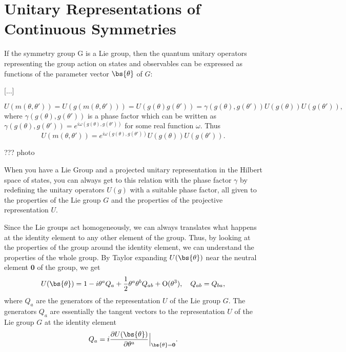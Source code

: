 \section{Unitary Representations of Continuous Symmetries}

If the symmetry group G is a Lie group, then the quantum unitary operators representing the group action on states and observables can be expressed as functions of the parameter vector \(\bs{\theta}\) of \(G\):

[...]

\[
    U(m(\theta, \theta')) = U(g(m(\theta, \theta'))) = U(g(\theta) g(\theta')) = \gamma(g(\theta), g(\theta')) U(g(\theta)) U(g(\theta')),
\]
where \(\gamma(g(\theta), g(\theta'))\) is a phase factor which can be written as \(\gamma(g(\theta), g(\theta')) = e^{i \omega(g(\theta), g(\theta'))}\) for some real function \(\omega\). Thus
\[
    U(m(\theta, \theta')) = e^{i \omega(g(\theta), g(\theta'))} U(g(\theta)) U(g(\theta')).
\]

\begin{example}[EXCERCISE]

    ??? photo

\end{example}

When you have a Lie Group and a projected unitary representation in the Hilbert space of states, you can always get to this relation with the phase factor \(\gamma\) by redefining the unitary operators \(U(g)\) with a suitable phase factor, all given to the properties of the Lie group \(G\) and the properties of the projective representation \(U\).

Since the Lie groups act homogeneously, we can always translates what happens at the identity element to any other element of the group. Thus, by looking at the properties of the group around the identity element, we can understand the properties of the whole group. By Taylor expanding \(U(\bs{\theta})\) near the neutral element \(\mathbf{0}\) of the group, we get
\[
    U(\bs{\theta}) = 1 - i \theta^a Q_a + \frac{1}{2} \theta^a \theta^b Q_{ab} + \mathrm{O}(\theta^3), \quad Q_{ab} = Q_{ba},
\]
where \(Q_a\) are the generators of the representation \(U\) of the Lie group \(G\). The generators \(Q_a\) are essentially the tangent vectors to the representation \(U\) of the Lie group \(G\) at the identity element
\[
    Q_a = i \frac{\partial U(\bs{\theta})}{\partial \theta^a} \Big|_{\bs{\theta} = \mathbf{0}}.
\]

